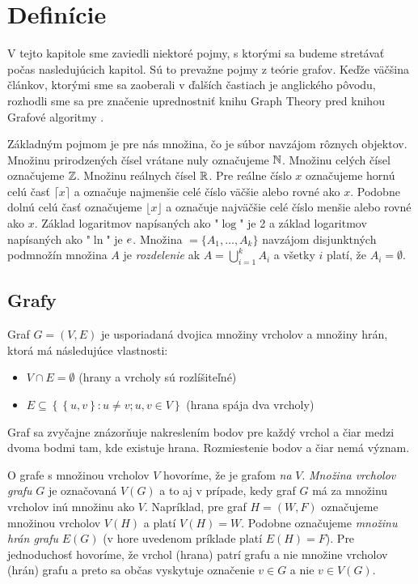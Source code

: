 
\chapter{Definície}\label{chap:definicie}

V tejto kapitole sme zaviedli niektoré pojmy, s ktorými sa budeme stretávať 
počas nasledujúcich kapitol. Sú to prevažne pojmy z teórie grafov. Keďže 
väčšina článkov, ktorými sme sa zaoberali v ďalších častiach je anglického 
pôvodu, rozhodli sme sa pre značenie uprednostniť knihu Graph Theory 
\citep{diestel} pred knihou Grafové algoritmy \citep{plesnik}. 

Základným pojmom je pre nás množina, čo je súbor navzájom rôznych objektov. 
Množinu prirodzených čísel vrátane nuly označujeme $\mathbb{N}$. Množinu celých 
čísel označujeme $\mathbb{Z}$. Množinu reálnych čísel $\mathbb{R}$. Pre reálne číslo 
$x$ označujeme hornú celú časť $\lceil x\rceil$ a označuje najmenšie celé 
číslo väčšie alebo rovné ako $x$. Podobne dolnú celú časť označujeme 
$\lfloor x\rfloor$ a označuje najväčšie celé číslo menšie alebo rovné ako $x$. 
Základ logaritmov napísaných ako "$\log$" je 2 a základ logaritmov napísaných 
ako "$\ln$" je $e$. Množina $\mathcal = \{A_1, \ldots, A_k\}$ navzájom 
disjunktných podmnožín množina $A$ je \emph{rozdelenie} ak 
$A = \bigcup_{i=1}^{k} A_i$ a všetky $i$ platí, že $A_i = \emptyset$.

\section{Grafy}

Graf $G = (V, E)$ je usporiadaná dvojica množiny vrcholov a množiny hrán, ktorá 
má následujúce vlastnosti: 
\begin{itemize}
	\item $V \cap E = \emptyset$ (hrany a vrcholy sú rozlíšiteľné)
	\item $E \subseteq\left\{ \left\{ u, v\right\} : u \neq v; u, v \in V\right\} $ 
		(hrana spája dva vrcholy)
\end{itemize}

Graf sa zvyčajne znázorňuje nakreslením bodov pre každý vrchol a čiar medzi 
dvoma bodmi tam, kde existuje hrana. Rozmiestenie bodov a čiar nemá význam. 

O grafe s množinou vrcholov $V$ hovoríme, že je grafom \emph{na} $V$. 
\emph{Množina 
vrcholov grafu} $G$ je označovaná $V(G)$ a to aj v prípade, kedy graf $G$ má za 
množinu vrcholov inú množinu ako $V$. Napríklad, pre graf $H = (W, F)$ 
označujeme množinou vrcholov $V(H)$ a platí $V(H) = W$. Podobne označujeme 
\emph{množinu hrán grafu} $E(G)$ (v hore uvedenom príklade platí $E(H) = F$). 
Pre jednoduchosť hovoríme, že vrchol (hrana) patrí grafu a nie množine vrcholov 
(hrán) grafu a preto sa občas vyskytuje označenie $v \in G$ a nie $v \in V(G)$. 

